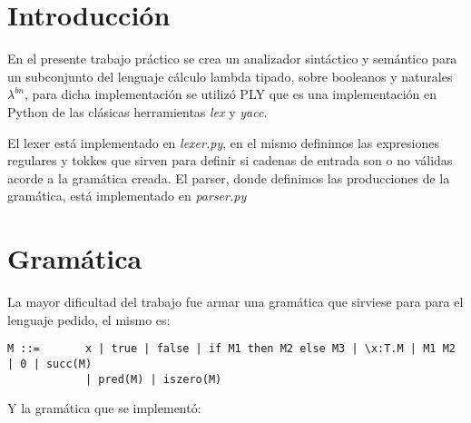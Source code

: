 \documentclass[spanish, a4paper]{article}
\begin{document}
\fecha{\today}


\maketitle


\newpage
\section{Introducción}
En el presente trabajo práctico se crea un analizador sintáctico y semántico para un subconjunto del lenguaje cálculo lambda tipado, sobre booleanos y naturales $\lambda^{bn}$, para dicha implementación se utilizó PLY que es una implementación en Python de las clásicas herramientas \textit{lex} y \textit{yacc}.

El lexer está implementado en \textit{lexer.py}, en el mismo definimos las expresiones regulares y tokkes que sirven para definir si cadenas de entrada son o no válidas acorde a la gramática creada.
El parser, donde definimos las producciones de la gramática, está implementado en \textit{parser.py}

\newpage
\section{Gramática}

La mayor dificultad del trabajo fue armar una gramática que sirviese para para el lenguaje pedido, el mismo es:

\begin{verbatim}
M ::= 		x | true | false | if M1 then M2 else M3 | \x:T.M | M1 M2 | 0 | succ(M) 
            | pred(M) | iszero(M)
\end{verbatim}

Y la gramática que se implementó:
\end{document}
